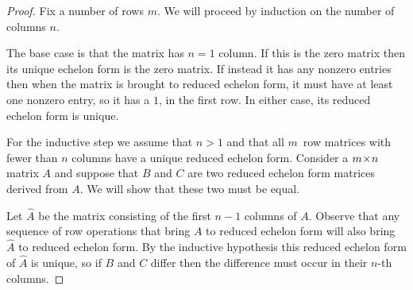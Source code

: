 \begin{proof} \cite{Yuster}
Fix a number of rows \( m \).
We will proceed by induction on the number of columns \( n \).

The base case is that the matrix has \( n=1 \) column.
If this is the zero matrix then its unique echelon form is the zero matrix. 
If instead it has any nonzero entries then when the matrix is brought to 
reduced echelon form, it must have at least one nonzero entry, so it has a
\( 1 \), in the first row. 
In either case, its reduced echelon form is unique.

For the inductive step we assume that \( n>1 \) and that all \( m \)~row
matrices with fewer than \( n \) columns have a unique reduced echelon form.
Consider a \( m \! \times \! n \) matrix \( A \) and suppose that 
\( B \) and \( C \) are two reduced echelon form matrices derived from \( A \).
We will show that these two must be equal.

Let \( \hat{A} \) be the matrix consisting of the first \( n-1 \) columns of
\( A \).
Observe that 
any sequence of row operations that bring \( A \) to reduced 
echelon form will also bring \( \hat{A} \) to reduced echelon form.
By the inductive hypothesis this reduced echelon form of \( \hat{A} \)
is unique, so if \( B \) and \( C \) differ then the difference must 
occur in their \( n \)-th columns.


\end{proof}

